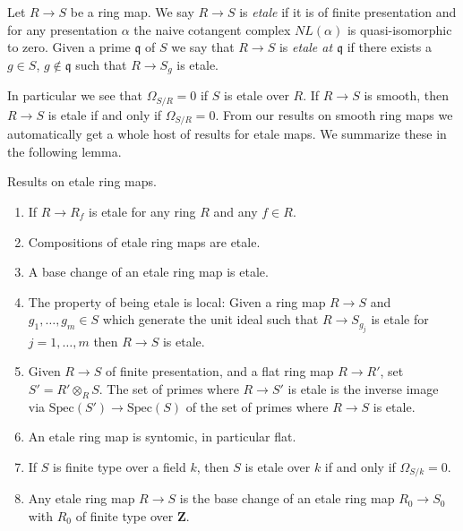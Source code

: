 \begin{definition}
\label{definition-etale}
Let $R \to S$ be a ring map.
We say $R \to S$ is {\it etale} if it is of finite presentation
and for any presentation $\alpha$ the naive cotangent complex
$NL(\alpha)$ is quasi-isomorphic to zero. Given a prime $\mathfrak q$
of $S$ we say that $R \to S$ is {\it etale at $\mathfrak q$}
if there exists a $g \in S$, $g \not \in \mathfrak q$ such that
$R \to S_g$ is etale.
\end{definition}

\noindent
In particular we see that $\Omega_{S/R} = 0$ if $S$ is etale over $R$.
If $R \to S$ is smooth,
then $R \to S$ is etale if and only if $\Omega_{S/R} = 0$.
From our results on smooth ring maps we automatically get a whole host
of results for etale maps. We summarize these in the following
lemma.

\begin{lemma}
\label{lemma-etale}
Results on etale ring maps.
\begin{enumerate}
\item If $R \to R_f$ is etale for any ring $R$ and any $f \in R$.
\item Compositions of etale ring maps are etale.
\item A base change of an etale ring map is etale.
\item The property of being etale is local: Given a ring map
$R \to S$ and $g_1, \ldots, g_m \in S$ which generate the unit ideal
such that $R \to S_{g_j}$ is etale for $j = 1, \ldots, m$ then
$R \to S$ is etale.
\item Given $R \to S$ of finite presentation, and a flat ring map
$R \to R'$, set $S' = R' \otimes_R S$. The set of primes where $R \to S'$
is etale is the inverse image via $\text{Spec}(S') \to \text{Spec}(S)$
of the set of primes where $R \to S$ is etale.
\item An etale ring map is syntomic, in particular flat.
\item If $S$ is finite type over a field $k$, then $S$ is etale over
$k$ if and only if $\Omega_{S/k} = 0$.
\item Any etale ring map $R \to S$ is the base change of an etale
ring map $R_0 \to S_0$ with $R_0$ of finite type over $\mathbf{Z}$.
\end{enumerate}
\end{lemma}

